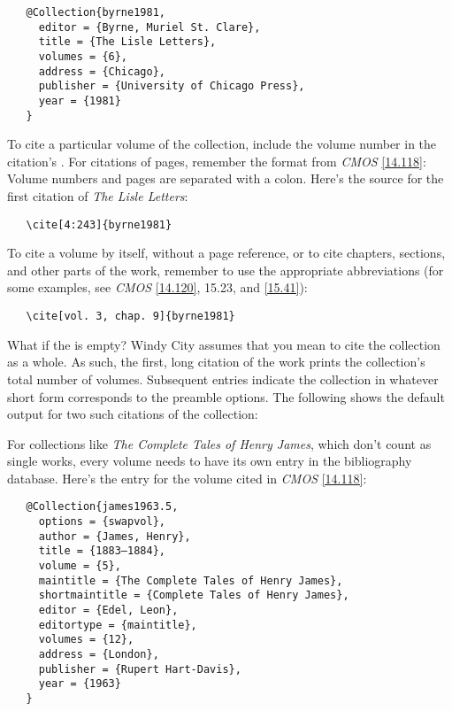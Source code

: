 \documentclass[11pt,letterpaper,oneside]{article}
\begin{document}
\begin{verbatim}
   @Collection{byrne1981,
     editor = {Byrne, Muriel St. Clare},
     title = {The Lisle Letters},
     volumes = {6},
     address = {Chicago},
     publisher = {University of Chicago Press},
     year = {1981}
   }
\end{verbatim}

To cite a particular volume of the collection, include the volume
number in the citation's . For citations of pages,
remember the format from \textit{CMOS} \ref{14.118}: Volume numbers
and pages are separated with a colon. Here's the source for the first
citation of \textit{The Lisle Letters}:

\begin{verbatim}
   \cite[4:243]{byrne1981}
\end{verbatim}

\noindent To cite a volume by itself, without a page reference, or to
cite chapters, sections, and other parts of the work, remember to use
the appropriate abbreviations (for some examples, see \textit{CMOS}
\ref{14.120}, 15.23, and \ref{15.41}):

\begin{verbatim}
   \cite[vol. 3, chap. 9]{byrne1981}
\end{verbatim}

What if the  is empty? Windy City assumes that you
mean to cite the collection as a whole. As such, the first, long
citation of the work prints the collection's total number of volumes.
Subsequent entries indicate the collection in whatever short form
corresponds to the preamble options. The following shows the default
output for two such citations of the collection:

\begin{citeonly}
\item \cite{byrne1981}
\item \cite{byrne1981}
\end{citeonly}

For collections like \textit{The Complete Tales of Henry James}, which
don't count as single works, every volume needs to have its own entry
in the bibliography database. Here's the entry for the volume cited in
\textit{CMOS} \ref{14.118}:

\begin{verbatim}
   @Collection{james1963.5,
     options = {swapvol},
     author = {James, Henry},
     title = {1883–1884},
     volume = {5},
     maintitle = {The Complete Tales of Henry James},
     shortmaintitle = {Complete Tales of Henry James},
     editor = {Edel, Leon},
     editortype = {maintitle},
     volumes = {12},
     address = {London},
     publisher = {Rupert Hart-Davis},
     year = {1963}
   }
\end{verbatim}
\end{document}
